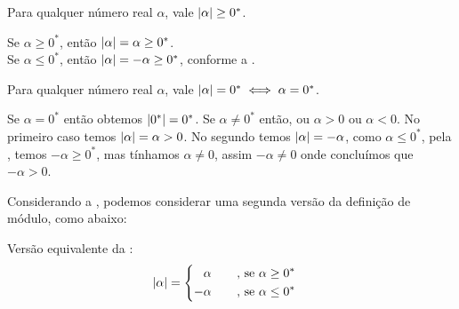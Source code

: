 \documentclass[../main.tex]{subfiles}
\begin{document}
\begin{teo}\label{reais-teo-moduloPositivo}
    Para qualquer número real $\alpha$, vale $\abs{\alpha} \geq 0^*$.
\end{teo}
\begin{dem}
    Se $\alpha \geq 0^*$, então $\abs{\alpha} = \alpha \geq 0^*$. \\
    Se $\alpha \leq 0^*$, então $\abs{\alpha} = -\alpha \geq 0^*$, conforme a . 
\end{dem}
\begin{prop}\label{reais-prop-mod00}
    Para qualquer número real $\alpha$, vale $\abs{\alpha} = 0^* \iff \alpha = 0^*$.
\end{prop}
\begin{dem}
    Se $\alpha = 0^*$ então obtemos $\abs{0^*} = 0^*$. 
    Se $\alpha \neq 0^*$ então, ou $\alpha > 0$ ou $\alpha < 0$. No primeiro caso temos $\abs{\alpha} = \alpha > 0$. No segundo temos $\abs{\alpha} = -\alpha$, como $\alpha \leq 0^*$, pela , temos $-\alpha \geq 0^*$, mas tínhamos $\alpha \neq 0$, assim $-\alpha \neq 0$ onde concluímos que $-\alpha > 0$.
\end{dem}

\begin{obs}
    Considerando a , podemos considerar uma segunda versão da definição de módulo, como abaixo:
\end{obs}

\begin{defi}\label{reais-def-modulo2}
    Versão equivalente da : 
    \begin{equation*}
        \abs{\alpha} = 
        \begin{cases}
        \begin{aligned}
             &\alpha \hspace{0.6cm} \text{ , se } \alpha \geq 0^* \\
            -&\alpha \hspace{0.6cm} \text{ , se } \alpha \leq 0^*
        \end{aligned}
        \end{cases}            
    \end{equation*}
\end{defi}
\end{document}
